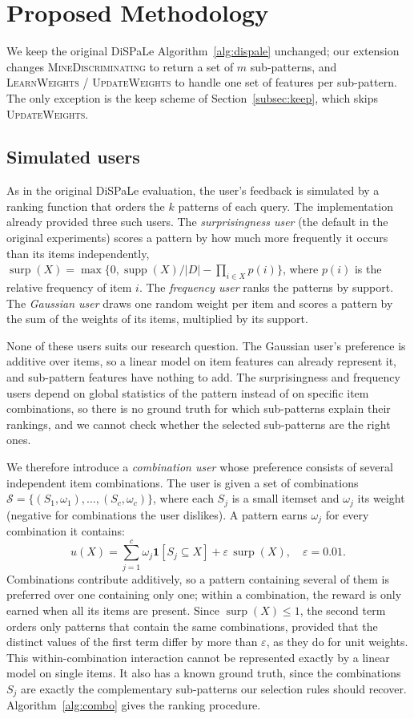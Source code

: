 \documentclass[sigconf]{acmart}
\newcommand{\surp}{\operatorname{surp}}
\newcommand{\supp}{\operatorname{supp}}
\begin{document}
\section{Proposed Methodology}
We keep the original DiSPaLe Algorithm~\ref{alg:dispale} unchanged; our extension changes \textsc{MineDiscriminating} to return a set of $m$ sub-patterns, and \textsc{LearnWeights} / \textsc{UpdateWeights} to handle one set of features per sub-pattern. The only exception is the keep scheme of Section~\ref{subsec:keep}, which skips \textsc{UpdateWeights}.

\subsection{Simulated users}
\label{subsec:users}
As in the original DiSPaLe evaluation, the user's feedback is simulated by a ranking function that orders the $k$ patterns of each query. The implementation already provided three such users. The \emph{surprisingness user} (the default in the original experiments) scores a pattern by how much more frequently it occurs than its items independently, $\surp(X)=\max\{0,\supp(X)/|D|-\prod_{i\in X}p(i)\}$, where $p(i)$ is the relative frequency of item $i$. The \emph{frequency user} ranks the patterns by support. The \emph{Gaussian user} draws one random weight per item and scores a pattern by the sum of the weights of its items, multiplied by its support.

None of these users suits our research question. The Gaussian user's preference is additive over items, so a linear model on item features can already represent it, and sub-pattern features have nothing to add. The surprisingness and frequency users depend on global statistics of the pattern instead of on specific item combinations, so there is no ground truth for which sub-patterns explain their rankings, and we cannot check whether the selected sub-patterns are the right ones.

We therefore introduce a \emph{combination user} whose preference consists of several independent item combinations. The user is given a set of combinations $\mathcal S=\{(S_1,\omega_1),\ldots,(S_c,\omega_c)\}$, where each $S_j$ is a small itemset and $\omega_j$ its weight (negative for combinations the user dislikes). A pattern earns $\omega_j$ for every combination it contains:
\begin{equation}\label{eq:combination}
 u(X)=\sum_{j=1}^{c}\omega_j\mathbf{1}[S_j\subseteq X]+\varepsilon\,\surp(X),\quad \varepsilon=0.01.
\end{equation}
Combinations contribute additively, so a pattern containing several of them is preferred over one containing only one; within a combination, the reward is only earned when all its items are present. Since $\surp(X)\leq1$, the second term orders only patterns that contain the same combinations, provided that the distinct values of the first term differ by more than $\varepsilon$, as they do for unit weights. This within-combination interaction cannot be represented exactly by a linear model on single items. It also has a known ground truth, since the combinations $S_j$ are exactly the complementary sub-patterns our selection rules should recover. Algorithm~\ref{alg:combo} gives the ranking procedure.
\end{document}
